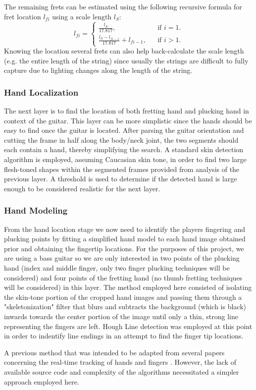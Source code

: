The remaining frets can be estimated using the following recursive formula for fret location $l_{fi}$ using a scale length $l_S$:
\begin{equation}
    l_{fi} = \begin{cases}
        \frac{l_S}{17.817},                         && \text{if $i = 1$.} \\
        \frac{l_S - l_{fi-1}}{17.817} + l_{fi-1},   && \text{if $i > 1$.}
    \end{cases}
\end{equation}
Knowing the location several frets can also help back-calculate the scale length (e.g. the entire length of the string) since
usually the strings are difficult to fully capture due to lighting changes along the length of the string.

\subsubsection{Hand Localization}
The next layer is to find the location of both fretting hand and plucking hand in context of the guitar.
This layer can be more simplistic since the hands should be easy to find once the guitar is located.
After parsing the guitar orientation and cutting the frame in half along the body/neck joint,
the two segments should each contain a hand, thereby simplifying the search.
A standard skin detection algorithm is employed, assuming Caucasian skin tone\cite{pyimagesearch,seereality,skinsurvey},
in order to find two large flesh-toned shapes within the segmented frames provided from analysis of
the previous layer.
A threshold is used to determine if the detected hand is large enough to be considered realistic for the next layer.

\subsubsection{Hand Modeling}
From the hand location stage we now need to identify the players fingering and plucking points
by fitting a simplified hand model to each hand image obtained prior and obtaining the fingertip locations.
For the purposes of this project, we are using a bass guitar so we are only interested in two points of the plucking hand
(index and middle finger, only two finger plucking techniques will be considered)
and four points of the fretting hand (no thumb fretting techniques will be considered) in this layer.
The method employed here consisted of isolating the skin-tone portion of the cropped hand images
and passing them through a "skeletonization" filter \cite{skeleton} that blurs and subtracts the background (which is black)
inwards towards the center portion of the image until only a thin, strong line representing the fingers are left.
Hough Line detection was employed at this point in order to indentify line endings in an attempt to find the finger tip locations.
\par
A previous method that was intended to be adapted from several papers concerning the real-time tracking of hands and fingers
\cite{aslhand,handposes,fingertracking}.
However, the lack of available source code and complexity of the algorithms necessitated a simpler approach employed here.

